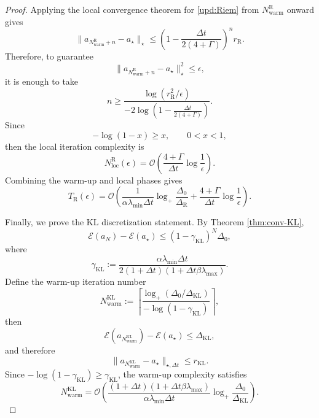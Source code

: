 \documentclass[11pt]{article}
\theoremstyle{plain}
\theoremstyle{definition}
\theoremstyle{remark}
\begin{document}
\begin{proof}
    Applying the local convergence theorem for \eqref{upd:Riem} from $N_\mathrm{warm}^\mathrm{R}$ onward gives
    \[
        \|a_{N_\mathrm{warm}^\mathrm{R}+n}-a_\star\|_\star
        \leq
        \left(
            1-\frac{\Delta t}{2(4+\Gamma)}
        \right)^n
        r_\mathrm{R}.
    \]
    Therefore, to guarantee
    \[
        \|a_{N_\mathrm{warm}^\mathrm{R}+n}-a_\star\|_\star^2
        \leq
        \epsilon,
    \]
    it is enough to take
    \[
        n
        \geq
        \frac{
            \log(r_\mathrm{R}^2/\epsilon)
        }{
            -2\log\left(
                1-\frac{\Delta t}{2(4+\Gamma)}
            \right)
        }.
    \]
    Since
    \[
        -\log(1-x)\geq x,
        \qquad 0<x<1,
    \]
    then the local iteration complexity is
    \[
        N_\mathrm{loc}^\mathrm{R}(\epsilon)
        =
        \mathcal O\left(
            \frac{4+\Gamma}{\Delta t}
            \log\frac{1}{\epsilon}
        \right).
    \]
    Combining the warm-up and local phases gives
    \[
        T_\mathrm{R}(\epsilon)
        =
        \mathcal O\left(
            \frac{1}{\alpha\lambda_{\min}\Delta t}
            \log_+
            \frac{\Delta_0}{\Delta_\mathrm{R}}
            +
            \frac{4+\Gamma}{\Delta t}
            \log\frac{1}{\epsilon}
        \right).
    \]

    Finally, we prove the KL discretization statement. By Theorem \ref{thm:conv-KL},
    \[
        \mathcal E(a_N)-\mathcal E(a_\star)
        \leq
        (1-\gamma_\mathrm{KL})^N
        \Delta_0,
    \]
    where
    \[
        \gamma_\mathrm{KL}
        :=
        \frac{
            \alpha\lambda_{\min}\Delta t
        }{
            2(1+\Delta t)(1+\Delta t\beta\lambda_{\max})
        }.
    \]
    Define the warm-up iteration number
    \[
        N_\mathrm{warm}^\mathrm{KL}
        :=
        \left\lceil
            \frac{
                \log_+(\Delta_0/\Delta_\mathrm{KL})
            }{
                -\log(1-\gamma_\mathrm{KL})
            }
        \right\rceil,
    \]
    then
    \[
        \mathcal E(a_{N_\mathrm{warm}^\mathrm{KL}})
        -
        \mathcal E(a_\star)
        \leq
        \Delta_\mathrm{KL},
    \]
    and therefore
    \[
        \|a_{N_\mathrm{warm}^\mathrm{KL}}-a_\star\|_{\star,\Delta t}
        \leq
        r_\mathrm{KL}.
    \]
    Since $-\log(1-\gamma_\mathrm{KL})\geq \gamma_\mathrm{KL}$, the warm-up complexity satisfies
    \[
        N_\mathrm{warm}^\mathrm{KL}
        =
        \mathcal O\left(
            \frac{(1+\Delta t)(1+\Delta t\beta\lambda_{\max})}
            {\alpha\lambda_{\min}\Delta t}
            \log_+
            \frac{\Delta_0}{\Delta_\mathrm{KL}}
        \right).
    \]


\end{proof}
\end{document}
